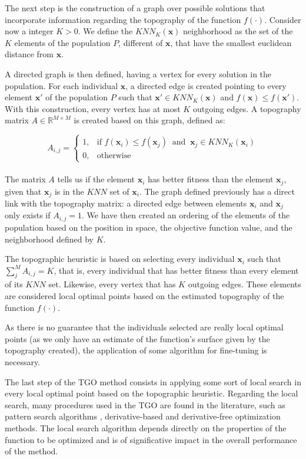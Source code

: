 The next step is the construction of a graph over possible solutions that incorporate information regarding the topography of the function $f(\cdot)$. Consider now a integer $K > 0$. We define the $KNN_K(\bm{x})$ neighborhood as the set of the $K$ elements of the population $P$, different of $\bm{x}$, that have the smallest euclidean distance from $\bm{x}$.

A directed graph is then defined, having a vertex for every solution in the population. For each individual $\bm{x}$, a directed edge is created pointing to every element $\bm{x'}$ of the population $P$ such that $\bm{x'} \in KNN_K(\bm{x})$ and $f(\bm{x}) \leq f(\bm{x'})$. With this construction, every vertex has at most $K$ outgoing edges. A topography matrix $A \in \mathbb{R}^{M \times M}$ is created based on this graph, defined as:


\[
    A_{i, j} = 
\begin{cases}
    1,& \text{if } f(\bm{x}_i) \leq f(\bm{x}_j) \ \text{ and } \ \bm{x}_j \in KNN_K(\bm{x}_i) \\
    0,& \text{otherwise}
\end{cases}
\]
\\[-1.5em]


The matrix $A$ tells us if the element $\bm{x}_i$ has better fitness than the element $\bm{x}_j$, given that $\bm{x}_j$ is in the $KNN$ set of $\bm{x}_i$. The graph defined previously has a direct link with the topography matrix: a directed edge between elements $\bm{x}_i$ and $\bm{x}_j$ only exists if $A_{i, j} = 1$. We have then created an ordering of the elements of the population based on the position in space, the objective function value, and the neighborhood defined by $K$.

The topographic heuristic is based on selecting every individual $\bm{x}_i$ such that \allowbreak $\sum_j^M A_{i, j} = K$, that is, every individual that has better fitness than every element of its $KNN$ set. Likewise, every vertex that has $K$ outgoing edges. These elements are considered local optimal points based on the estimated topography of the function $f(\cdot)$.

As there is no guarantee that the individuals selected are really local optimal points (as we only have an estimate of the function's surface given by the topography created), the application of some algorithm for fine-tuning is necessary.

The last step of the TGO method consists in applying some sort of local search in every local optimal point based on the topographic heuristic. Regarding the local search, many procedures used in the TGO are found in the literature, such as pattern search algorithms \citep{ITGO2}, derivative-based \citep{ITGO3} and derivative-free \citep{ITGO4} optimization methods. The local search algorithm depends directly on the properties of the function to be optimized and is of significative impact in the overall performance of the method.

